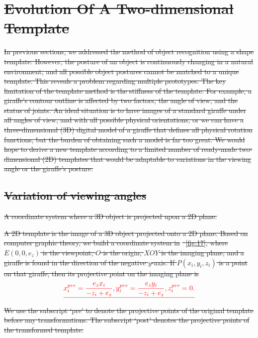 \documentclass[journal]{IEEEtran}
\providecommand{\DIFdel}[1]{{\protect\color{red}\sout{#1}}}                      %
\providecommand{\DIFdelbegin}{} %
\begin{document}
\DIFdelbegin \section{\DIFdel{Evolution Of A Two-dimensional Template}}
\addtocounter{section}{-1}%

\DIFdel{In previous sections, we addressed the method of object recognition using a shape template. 
However, the posture of an object is continuously changing in a natural environment, 
and all possible object postures cannot be matched to a unique template. 
This reveals a problem regarding multiple prototypes. 
The key limitation of the template method is the stiffness of the template. 
For example, a giraffe's contour outline is affected by two factors, 
the angle of view, and the status of joints. 
An ideal situation is to have images of a standard giraffe under all angles of view, 
and with all possible physical orientations, 
or we can have a three-dimensional (3D) digital model of a giraffe that defines all physical rotation functions, 
but the burden of obtaining such a model is far too great. 
We would hope to derive a new template according to a limited number of ready-made two-dimensional (2D) templates that would be adaptable to variations in the viewing angle or the giraffe's posture.
}%

\subsection{\DIFdel{Variation of viewing angles}}
\addtocounter{subsection}{-1}%

{%
\DIFdel{A coordinate system where a 3D object is projected upon a 2D plane.}}

\DIFdel{A 2D template is the image of a 3D object projected onto a 2D plane. 
Based on computer graphic theory, we build a coordinate system in }%
\DIFdel{~\ref{fig:17}, 
where $E(0,0,e_z)$ is the viewpoint, $O$ is the origin, $XOY$ is the imaging plane, 
and a giraffe is found in the direction of the negative $y$-axis.
If $P(x_i,y_i,z_i)$ is a point on that giraffe, 
then its projective point on the imaging plane is
}\begin{displaymath}\DIFdel{
x_i^{pre}=\frac{e_z x_i}{-z_i+e_z}, y_i^{pre}=\frac{e_z y_i}{-z_i+e_z}, z_i^{pre}=0.
\label{eqn:2}
}\end{displaymath}
\DIFdel{We use the subscript `pre' to denote the projective points of the original template before any transformations.
The subscript `post' denotes the projective points of the transformed template.
}%
\end{document}
